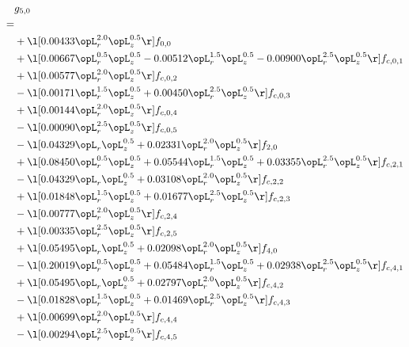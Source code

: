 \begin{alignat}{2} 
\label{eq:g_50_0} 
& g_{5,0} \nonumber \\ 
 = \\ 
& + \l[  0.00433 \opL_r^{2.0} \opL_z^{0.5}  \r] f_{0,0} \nonumber \\ 
& + \l[  0.00667 \opL_r^{0.5} \opL_z^{0.5}   -0.00512 \opL_r^{1.5} \opL_z^{0.5}   -0.00900 \opL_r^{2.5} \opL_z^{0.5}  \r] f_{c,0,1} \nonumber \\ 
& + \l[  0.00577 \opL_r^{2.0} \opL_z^{0.5}  \r] f_{c,0,2} \nonumber \\ 
& - \l[  0.00171 \opL_r^{1.5} \opL_z^{0.5} +  0.00450 \opL_r^{2.5} \opL_z^{0.5}  \r] f_{c,0,3} \nonumber \\ 
& + \l[  0.00144 \opL_r^{2.0} \opL_z^{0.5}  \r] f_{c,0,4} \nonumber \\ 
& - \l[  0.00090 \opL_r^{2.5} \opL_z^{0.5}  \r] f_{c,0,5} \nonumber \\ 
& - \l[  0.04329 \opL_r \opL_z^{0.5} +  0.02331 \opL_r^{2.0} \opL_z^{0.5}  \r] f_{2,0} \nonumber \\ 
& + \l[  0.08450 \opL_r^{0.5} \opL_z^{0.5} +  0.05544 \opL_r^{1.5} \opL_z^{0.5} +  0.03355 \opL_r^{2.5} \opL_z^{0.5}  \r] f_{c,2,1} \nonumber \\ 
& - \l[  0.04329 \opL_r \opL_z^{0.5} +  0.03108 \opL_r^{2.0} \opL_z^{0.5}  \r] f_{c,2,2} \nonumber \\ 
& + \l[  0.01848 \opL_r^{1.5} \opL_z^{0.5} +  0.01677 \opL_r^{2.5} \opL_z^{0.5}  \r] f_{c,2,3} \nonumber \\ 
& - \l[  0.00777 \opL_r^{2.0} \opL_z^{0.5}  \r] f_{c,2,4} \nonumber \\ 
& + \l[  0.00335 \opL_r^{2.5} \opL_z^{0.5}  \r] f_{c,2,5} \nonumber \\ 
& + \l[  0.05495 \opL_r \opL_z^{0.5} +  0.02098 \opL_r^{2.0} \opL_z^{0.5}  \r] f_{4,0} \nonumber \\ 
& - \l[  0.20019 \opL_r^{0.5} \opL_z^{0.5} +  0.05484 \opL_r^{1.5} \opL_z^{0.5} +  0.02938 \opL_r^{2.5} \opL_z^{0.5}  \r] f_{c,4,1} \nonumber \\ 
& + \l[  0.05495 \opL_r \opL_z^{0.5} +  0.02797 \opL_r^{2.0} \opL_z^{0.5}  \r] f_{c,4,2} \nonumber \\ 
& - \l[  0.01828 \opL_r^{1.5} \opL_z^{0.5} +  0.01469 \opL_r^{2.5} \opL_z^{0.5}  \r] f_{c,4,3} \nonumber \\ 
& + \l[  0.00699 \opL_r^{2.0} \opL_z^{0.5}  \r] f_{c,4,4} \nonumber \\ 
& - \l[  0.00294 \opL_r^{2.5} \opL_z^{0.5}  \r] f_{c,4,5} \nonumber \\ 

\end{alignat}

